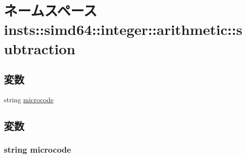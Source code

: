 \hypertarget{namespaceinsts_1_1simd64_1_1integer_1_1arithmetic_1_1subtraction}{
\section{ネームスペース insts::simd64::integer::arithmetic::subtraction}
\label{namespaceinsts_1_1simd64_1_1integer_1_1arithmetic_1_1subtraction}
}
\subsection*{変数}
\begin{DoxyCompactItemize}
\item 
string \hyperlink{namespaceinsts_1_1simd64_1_1integer_1_1arithmetic_1_1subtraction_a770f11a173e99389a8802f0107ed8f52}{microcode}
\end{DoxyCompactItemize}


\subsection{変数}
\hypertarget{namespaceinsts_1_1simd64_1_1integer_1_1arithmetic_1_1subtraction_a770f11a173e99389a8802f0107ed8f52}{
\subsubsection[{microcode}]{\setlength{\rightskip}{0pt plus 5cm}string {\bf microcode}}}
\label{namespaceinsts_1_1simd64_1_1integer_1_1arithmetic_1_1subtraction_a770f11a173e99389a8802f0107ed8f52}

